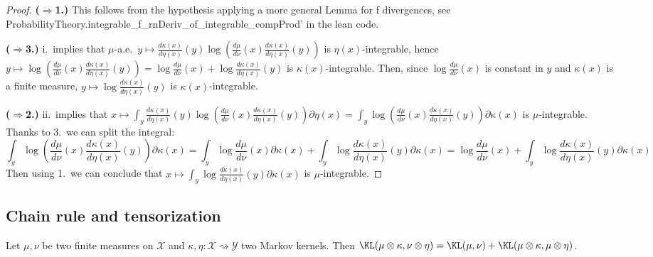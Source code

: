 \begin{proof}
{\bfseries($\Rightarrow$1.)} This follows from the hypothesis applying a more general Lemma for f divergences, see ProbabilityTheory.integrable\_f\_rnDeriv\_of\_integrable\_compProd' in the lean code.

{\bfseries($\Rightarrow$3.)} i.\ implies that $\mu$-a.e.\ $y \mapsto \frac{d \kappa(x)}{d \eta(x)}(y) \log \left(\frac{d \mu}{d \nu}(x) \frac{d \kappa(x)}{d \eta(x)}(y) \right)$ is $\eta(x)$-integrable, hence $y \mapsto \log \left(\frac{d \mu}{d \nu}(x) \frac{d \kappa(x)}{d \eta(x)}(y) \right) = \log \frac{d \mu}{d \nu}(x) + \log \frac{d \kappa(x)}{d \eta(x)}(y)$ is $\kappa(x)$-integrable. Then, since $\log \frac{d \mu}{d \nu}(x)$ is constant in $y$ and $\kappa(x)$ is a finite measure, $y \mapsto \log \frac{d \kappa(x)}{d \eta(x)}(y)$ is $\kappa(x)$-integrable.

{\bfseries($\Rightarrow$2.)} ii.\ implies that $x \mapsto  \int_y \frac{d \kappa(x)}{d \eta(x)}(y) \log \left(\frac{d \mu}{d \nu}(x) \frac{d \kappa(x)}{d \eta(x)}(y) \right) \partial \eta (x) = \int_y \log \left(\frac{d \mu}{d \nu}(x) \frac{d \kappa(x)}{d \eta(x)}(y) \right) \partial \kappa (x)$ is $\mu$-integrable. 
Thanks to 3.\ we can split the integral:
$$\int_y \log \left(\frac{d \mu}{d \nu}(x) \frac{d \kappa(x)}{d \eta(x)}(y) \right) \partial \kappa (x)
= \int_y \log \frac{d \mu}{d \nu}(x) \partial \kappa (x) + \int_y \log \frac{d \kappa(x)}{d \eta(x)}(y) \partial \kappa (x) = \log \frac{d \mu}{d \nu}(x) + \int_y \log \frac{d \kappa(x)}{d \eta(x)}(y) \partial \kappa (x)$$
Then using 1.\ we can conclude that $x \mapsto \int_y \log \frac{d \kappa(x)}{d \eta(x)}(y) \partial \kappa (x)$ is $\mu$-integrable.

\end{proof}



\subsection{Chain rule and tensorization}

\begin{theorem}
  \label{thm:kl_compProd_aux}
  Let $\mu, \nu$ be two finite measures on $\mathcal X$ and $\kappa, \eta : \mathcal X \rightsquigarrow \mathcal Y$ two Markov kernels.
  Then $\KL(\mu \otimes \kappa, \nu \otimes \eta) = \KL(\mu, \nu) + \KL(\mu \otimes \kappa, \mu \otimes \eta)$.
\end{theorem}

